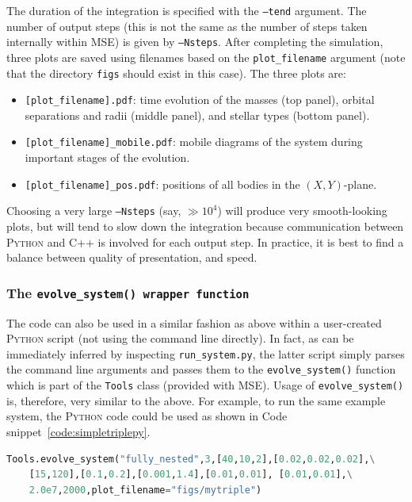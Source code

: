 \documentclass[a4paper,11pt]{article}
\newcommand{\mse}{\textsc{MSE}}
\newcommand{\code}{Code snippet}
\begin{document}
The duration of the integration is specified with the \texttt{--tend} argument. The number of output steps (this is not the same as the number of steps taken internally within \mse) is given by \texttt{--Nsteps}. After completing the simulation, three plots are saved using filenames based on the \texttt{plot\_filename} argument (note that the directory \texttt{figs} should exist in this case). The three plots are:
\begin{itemize}%
\item {\texttt{[plot\_filename].pdf}}: time evolution of the masses (top panel), orbital separations and radii (middle panel), and stellar types (bottom panel). 
\item {\texttt{[plot\_filename]\_mobile.pdf}}: mobile diagrams of the system during important stages of the evolution.
\item {\texttt{[plot\_filename]\_pos.pdf}}: positions of all bodies in the $(X,Y)$-plane. 
\end{itemize}

\begin{leftbar}
Choosing a very large \texttt{--Nsteps} (say, $\gg 10^4$) will produce very smooth-looking plots, but will tend to slow down the integration because communication between \textsc{Python} and \textsc{C++} is involved for each output step. In practice, it is best to find a balance between quality of presentation, and speed. 
\end{leftbar}

\subsubsection{The \texttt{evolve\_system() wrapper function}}
\label{sect:usepy:basic:ev}
The code can also be used in a similar fashion as above within a user-created \textsc{Python} script (not using the command line directly). In fact, as can be immediately inferred by inspecting \texttt{run\_system.py}, the latter script simply parses the command line arguments and passes them to the \texttt{evolve\_system()} function which is part of the \texttt{Tools} class (provided with \mse). Usage of \texttt{evolve\_system()} is, therefore, very similar to the above. For example, to run the same example system, the \textsc{Python} code could be used as shown in \code~\ref{code:simpletriplepy}.
\begin{lstlisting}[caption={Example usage within \textsc{Python} using \texttt{evolve\_system.py} for a triple.},label={code:simpletriplepy},language=Python]
Tools.evolve_system("fully_nested",3,[40,10,2],[0.02,0.02,0.02],\
    [15,120],[0.1,0.2],[0.001,1.4],[0.01,0.01], [0.01,0.01],\
    2.0e7,2000,plot_filename="figs/mytriple")
\end{lstlisting}
\end{document}

